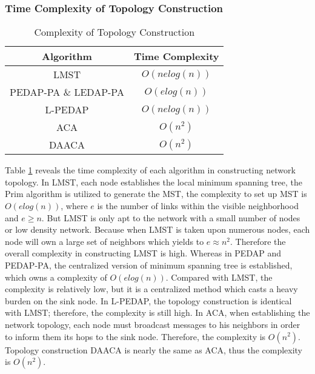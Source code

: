 \documentclass{elsarticle}
\begin{document}
\subsubsection{Time Complexity of Topology Construction} \label{ComplexityofTopologyConstruction}
\begin{table}[!hbp]
\centering
\caption{Complexity of Topology Construction} \label{ComplexityOfTopologyConstructionTable}
\begin{tabular}{cc}
\toprule
\textbf{Algorithm} & \textbf{Time Complexity} \\
\midrule
LMST & $O(nelog(n))$ \\
PEDAP-PA \& LEDAP-PA & $O(elog(n))$ \\
L-PEDAP & $O(nelog(n))$ \\
ACA & $O(n^2)$ \\
DAACA & $O(n^2)$ \\
\bottomrule
\end{tabular}

\end{table}

Table \ref{ComplexityOfTopologyConstructionTable} reveals the time complexity of each algorithm in constructing network topology. In LMST, each node establishes the local minimum spanning tree, the Prim algorithm is utilized to generate the MST, the complexity to set up MST is $O(elog(n))$, where $e$ is the number of links within the visible neighborhood \cite{label-8} and $e \geq n$. But LMST is only apt to the network with a small number of nodes or low density network. Because when LMST is taken upon numerous nodes, each node will own a large set of neighbors which yields to $e \approx n^2$. Therefore the overall complexity in constructing LMST is high. Whereas in PEDAP and PEDAP-PA, the centralized version of minimum spanning tree is established, which owns a complexity of $O(elog(n))$. Compared with LMST, the complexity is relatively low, but it is a centralized method which casts a heavy burden on the sink node. In L-PEDAP, the topology construction is identical with LMST; therefore, the complexity is still high. In ACA, when establishing the network topology, each node must broadcast messages to his neighbors in order to inform them its hops to the sink node. Therefore, the complexity is $O(n^2)$. Topology construction DAACA is nearly the same as ACA, thus the complexity is $O(n^2)$.
\end{document}

